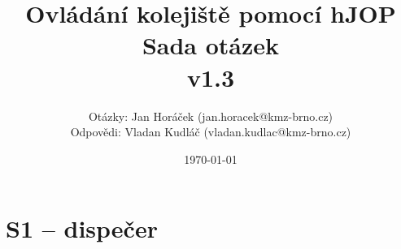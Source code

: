 \documentclass[12pt,a4paper]{article}
\begin{document}
\thispagestyle{empty}
\noindent

\setlength{\droptitle}{-5em}

\title{
\Large Ovládání kolejiště pomocí hJOP\\
\LARGE Sada otázek\\
\small v1.3}
\author{Otázky: Jan Horáček (jan.horacek@kmz-brno.cz)\\Odpovědi: Vladan Kudláč (vladan.kudlac@kmz-brno.cz)}
\date{\today}
\maketitle

\section*{S1 – dispečer}
\end{document}
